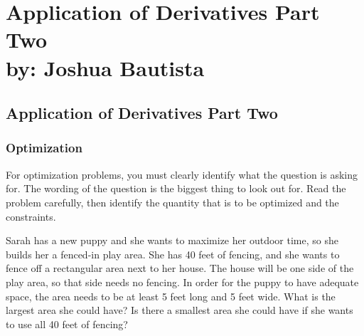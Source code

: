 \documentclass[12pt,fleqn]{book} %
\begin{document}
\part{Application of Derivatives Part Two\\ by: Joshua Bautista}


\pagebreak

\chapter{Application of Derivatives Part Two}

\vspace*{-15mm}

\section{Optimization}

{\small For optimization problems, you must clearly identify what the question is asking for. The wording of the question is the biggest thing to look out for.
    Read the problem carefully, then identify the quantity that is to be optimized and the constraints.}

\vspace*{5mm}


\noindent \small Sarah has a new puppy and she wants to maximize her outdoor time, so she builds her a fenced-in play area. She has 40 feet of fencing,
and she wants to fence off a rectangular area next to her house. The house will be one side of the play area, so that side needs no fencing. In order
for the puppy to have adequate space, the area needs to be at least 5  feet long and 5 feet wide. What is the largest area she could have? Is there a
smallest area she could have if she wants to use all 40 feet of fencing?

\vspace*{2.5mm}
\end{document}
